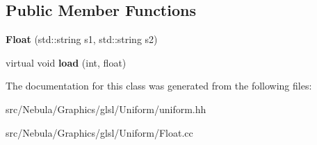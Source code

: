 \subsection*{\-Public \-Member \-Functions}
\begin{DoxyCompactItemize}
\item 
\hypertarget{classNeb_1_1glsl_1_1Uniform_1_1Vector_1_1Float_a79fa9f7bd948d86a054e5ab2bd0f4e40}{{\bfseries \-Float} (std\-::string s1, std\-::string s2)}\label{classNeb_1_1glsl_1_1Uniform_1_1Vector_1_1Float_a79fa9f7bd948d86a054e5ab2bd0f4e40}

\item 
\hypertarget{classNeb_1_1glsl_1_1Uniform_1_1Vector_1_1Float_a9a71da7e73a83c7e3f8d243a994bf4b8}{virtual void {\bfseries load} (int, float)}\label{classNeb_1_1glsl_1_1Uniform_1_1Vector_1_1Float_a9a71da7e73a83c7e3f8d243a994bf4b8}

\end{DoxyCompactItemize}


\-The documentation for this class was generated from the following files\-:\begin{DoxyCompactItemize}
\item 
src/\-Nebula/\-Graphics/glsl/\-Uniform/uniform.\-hh\item 
src/\-Nebula/\-Graphics/glsl/\-Uniform/\-Float.\-cc\end{DoxyCompactItemize}

